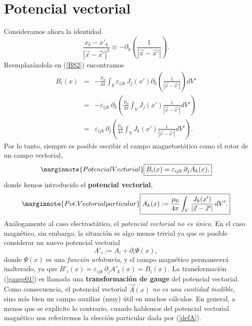 \section{Potencial vectorial}
Consideramos ahora la identidad
\begin{equation}
\frac{x_k-x'_k}{\left\vert
\vec{x}-\vec{x}'\right\vert^3}\equiv -\partial_k\left(
\frac{1}{\left\vert\vec{x}-\vec{x}'\right\vert }\right).
\end{equation}
Reemplazándola en (\ref{BS2}) encontramos
\begin{eqnarray}
 B_i(x)&=&-\frac{\mu_0}{4\pi}\int_V\varepsilon_{ijk}\,J_j(x')
\partial_k\left(\frac{1}{\left\vert\vec{x}-\vec{x}'\right\vert }\right)dV'
\label{BS3} \\
&=&-\varepsilon_{ijk}\,\partial_k\left(\frac{\mu_0}{4\pi}\int_VJ_j(x')\frac{1}{
\left\vert\vec{x} -\vec{x}'\right\vert }dV'\right)\\
&=&\varepsilon_{ijk}\,\partial_j\left(\frac{\mu_0}{4\pi}\int_VJ_k(x')\frac{1}{
\left\vert\vec{x} -\vec{x}'\right\vert }dV'\right).
\end{eqnarray}
Por lo tanto, siempre es posible escribir el campo magnetostático como el rotor de un campo vectorial,
\begin{equation}\marginnote{Potencial Vectorial}
\boxed{B_i(x)=\varepsilon_{ijk}\,\partial_jA_k(x),}\label{rot-A}
\end{equation}
donde hemos introducido el \textbf{potencial vectorial},
\begin{equation}\marginnote{Pot. Vectorial particular}
\boxed{A_k(x):=\frac{\mu_0}{4\pi}\int_V\frac{J_k(x')}{\left\vert\vec{x}-\vec{x}
'\right\vert }\,dV'.}
\label{defA}
\end{equation}
Análogamente al caso electrostático, el \textit{potencial vectorial no es único}. En el caso magnético, sin embargo, la situación es algo menos trivial ya que es posible considerar un nuevo potencial vectorial
\begin{equation}
A'_i:=A_i+\partial_i\Psi(x), \label{gauge01}
\end{equation}
donde $\Psi(x)$ es una \textit{función arbitraria}, y el campo magnético
permanecerá inalterado, ya que $B'_i(x)=\varepsilon_{ijk}\,\partial_jA'_k(x)=B_i(x)$. La transformación (\ref{gauge01}) es llamada una \textbf{transformación de gauge}
del potencial vectorial. Como consecuencia, el potencial vectorial $\vec{A}(x)$
\textit{no es una cantidad medible}, sino más bien un campo auxiliar (muy)
útil en muchos cálculos. En general, a menos que se explicite lo contrario,
cuando hablemos del potencial vectorial magnético nos referiremos la elección particular 
dada por (\ref{defA}).



